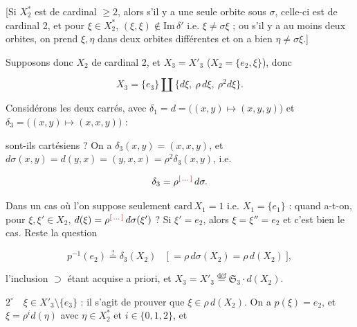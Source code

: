 \documentclass[11pt,a4paper]{article}
\begin{document}
[Si $X^{*}_2$ est de cardinal $\geq 2$, alors s'il y a une seule orbite sous
$\sigma$, celle-ci est de cardinal 2, et pour $\xi \in X^{*}_2$,
$(\xi,\xi) \notin \mathrm{Im}\,\delta'$ i.e. $\xi \neq \sigma\xi$ ; ou s'il y a
au moins deux orbites, on prend $\xi, \eta$ dans deux orbites différentes et on
a bien $\eta \neq \sigma\xi$.]

Supposons donc $X_2$ de cardinal 2, et $X_3 = X'_3$
\quad ($X_2 = \{e_2, \xi\}$), donc

\[
  X_3 = \{e_3\} \amalg \{d\xi,\ \rho\,d\xi,\ \rho^2 d\xi\}.
\]

Considérons les deux carrés, avec
$\delta_1 = d = \bigl((x,y) \mapsto (x,y,y)\bigr)$ et
$\delta_3 = \bigl((x,y) \mapsto (x,x,y)\bigr)$ :

\qquad
{}

sont-ils cartésiens ? On a $\delta_3(x,y) = (x,x,y)$, et
$d\sigma(x,y) = d(y,x) = (y,x,x) = \rho^2\delta_3(x,y)$, i.e.

\[
  \delta_3 = \rho^{\ill}\,d\sigma .
\]


Dans un cas où l'on suppose seulement $\mathrm{card}\,X_1 = 1$ i.e.
$X_1 = \{e_1\}$ : quand a-t-on, pour $\xi, \xi' \in X_2$,
$d(\xi) = \rho^{\ill}\,d\sigma(\xi')$ ? Si $\xi' = e_2$, alors
$\xi = \xi'' = e_2$ et c'est bien le cas. Reste la question

\[
  p^{-1}(e_2) \overset{?}{=} \delta_3(X_2)
    \quad \bigl[\ = \rho\,d\sigma(X_2) = \rho\,d(X_2)\ \bigr],
\]

l'inclusion $\supset$ étant acquise a priori, et $X_3 = X'_3
\overset{\text{déf}}{=} \mathfrak{S}_3 \cdot d(X_2)$.

$2^{\circ}$\ \ $\xi \in X'_3 \setminus \{e_3\}$ : il s'agit de prouver que
$\xi \in \rho\,d(X_2)$. On a $p(\xi) = e_2$, et $\xi = \rho^i d(\eta)$ avec
$\eta \in X^{*}_2$ et $i \in \{0,1,2\}$, et
\end{document}
